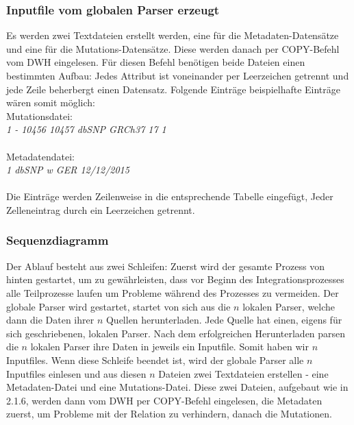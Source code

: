 \subsubsection{Inputfile vom globalen Parser erzeugt}
Es werden zwei Textdateien erstellt werden, eine für die Metadaten-Datensätze und eine für die Mutations-Datensätze. Diese werden danach per COPY-Befehl vom DWH eingelesen. Für diesen Befehl benötigen beide Dateien einen bestimmten Aufbau: Jedes Attribut ist voneinander per Leerzeichen getrennt und jede Zeile beherbergt einen Datensatz. Folgende Einträge beispielhafte Einträge wären somit möglich:\\
Mutationsdatei:\\
\textit{1 - 10456 10457 dbSNP GRCh37 17 1}\\
\\
Metadatendatei:\\
\textit{1 dbSNP w GER 12/12/2015}\\
\\
Die Einträge werden Zeilenweise in die entsprechende Tabelle eingefügt, Jeder Zelleneintrag durch ein Leerzeichen getrennt.
\subsubsection{Sequenzdiagramm}
Der Ablauf besteht aus zwei Schleifen: Zuerst wird der gesamte Prozess von hinten gestartet, um zu gewährleisten, dass vor Beginn des Integrationsprozesses alle Teilprozesse laufen um Probleme während des Prozesses zu vermeiden. Der globale Parser wird gestartet, startet von sich aus die $n$ lokalen Parser, welche dann die Daten ihrer $n$ Quellen herunterladen. Jede Quelle hat einen, eigens für sich geschriebenen, lokalen Parser. Nach dem erfolgreichen Herunterladen parsen die $n$ lokalen Parser ihre Daten in jeweils ein Inputfile. Somit haben wir $n$ Inputfiles. Wenn diese Schleife beendet ist, wird der globale Parser alle $n$ Inputfiles einlesen und aus diesen $n$ Dateien zwei Textdateien erstellen - eine Metadaten-Datei und eine Mutations-Datei. Diese zwei Dateien, aufgebaut wie in 2.1.6, werden dann vom DWH per COPY-Befehl eingelesen, die Metadaten zuerst, um Probleme mit der Relation zu verhindern, danach die Mutationen.
\newpage

